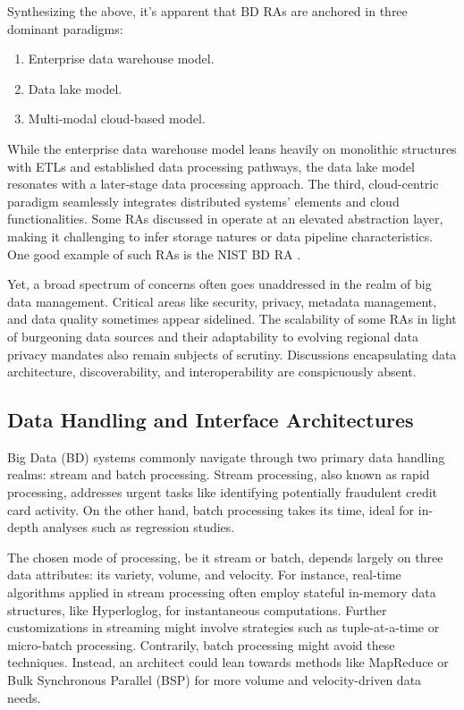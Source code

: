\documentclass[conference]{IEEEtran}
\begin{document}
Synthesizing the above, it's apparent that BD RAs are anchored in three dominant paradigms:

\begin{enumerate}
    \item Enterprise data warehouse model.
    \item     Data lake model.
    \item     Multi-modal cloud-based model.
\end{enumerate}

While the enterprise data warehouse model leans heavily on monolithic structures with ETLs and established data processing pathways, the data lake model resonates with a later-stage data processing approach. The third, cloud-centric paradigm seamlessly integrates distributed systems’ elements and cloud functionalities. Some RAs discussed in \cite{b1} operate at an elevated abstraction layer, making it challenging to infer storage natures or data pipeline characteristics. One good example of such RAs is the NIST BD RA \cite{b3}.

Yet, a broad spectrum of concerns often goes unaddressed in the realm of big data management. Critical areas like security, privacy, metadata management, and data quality sometimes appear sidelined. The scalability of some RAs in light of burgeoning data sources and their adaptability to evolving regional data privacy mandates also remain subjects of scrutiny. Discussions encapsulating data architecture, discoverability, and interoperability are conspicuously absent. 

\subsection{Data Handling and Interface Architectures}

Big Data (BD) systems commonly navigate through two primary data handling realms: stream and batch processing. Stream processing, also known as rapid processing, addresses urgent tasks like identifying potentially fraudulent credit card activity. On the other hand, batch processing takes its time, ideal for in-depth analyses such as regression studies.

The chosen mode of processing, be it stream or batch, depends largely on three data attributes: its variety, volume, and velocity. For instance, real-time algorithms applied in stream processing often employ stateful in-memory data structures, like Hyperloglog, for instantaneous computations. Further customizations in streaming might involve strategies such as tuple-at-a-time or micro-batch processing. Contrarily, batch processing might avoid these techniques. Instead, an architect could lean towards methods like MapReduce or Bulk Synchronous Parallel (BSP) for more volume and velocity-driven data needs.
\end{document}
